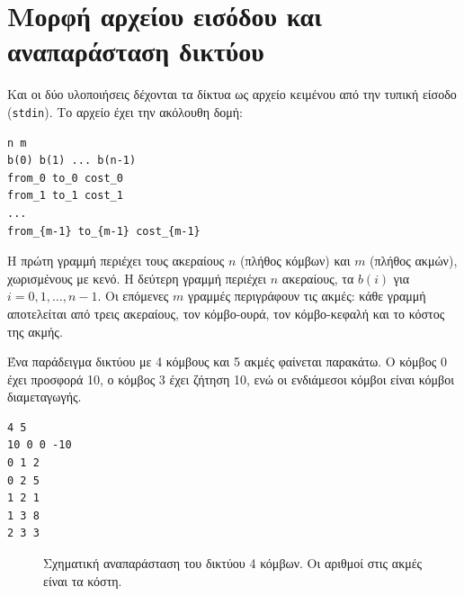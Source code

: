 \documentclass[11pt,a4paper,oneside]{report}
\begin{document}
\section{Μορφή αρχείου εισόδου και αναπαράσταση δικτύου}

Και οι δύο υλοποιήσεις δέχονται τα δίκτυα ως αρχείο κειμένου από την τυπική είσοδο (\texttt{stdin}). Το αρχείο έχει την ακόλουθη δομή:

\begin{verbatim}
n m
b(0) b(1) ... b(n-1)
from_0 to_0 cost_0
from_1 to_1 cost_1
...
from_{m-1} to_{m-1} cost_{m-1}
\end{verbatim}

Η πρώτη γραμμή περιέχει τους ακεραίους $n$ (πλήθος κόμβων) και $m$ (πλήθος ακμών), χωρισμένους με κενό. Η δεύτερη γραμμή περιέχει $n$ ακεραίους, τα $b(i)$ για $i = 0, 1, \ldots, n-1$. Οι επόμενες $m$ γραμμές περιγράφουν τις ακμές: κάθε γραμμή αποτελείται από τρεις ακεραίους, τον κόμβο-ουρά, τον κόμβο-κεφαλή και το κόστος της ακμής.

Ένα παράδειγμα δικτύου με 4 κόμβους και 5 ακμές φαίνεται παρακάτω. Ο κόμβος 0 έχει προσφορά 10, ο κόμβος 3 έχει ζήτηση 10, ενώ οι ενδιάμεσοι κόμβοι είναι κόμβοι διαμεταγωγής.

\begin{verbatim}
4 5
10 0 0 -10
0 1 2
0 2 5
1 2 1
1 3 8
2 3 3
\end{verbatim}

\begin{figure}[h]
\centering
{}
\caption{Σχηματική αναπαράσταση του δικτύου 4 κόμβων. Οι αριθμοί στις ακμές είναι τα κόστη.}
\label{fig:network}
\end{figure}
\end{document}
